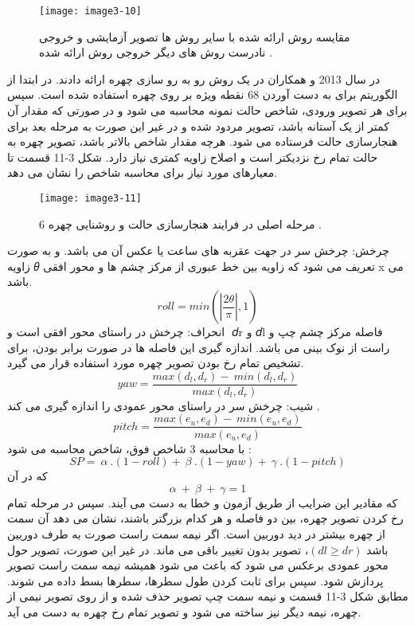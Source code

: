 \begin{figure}[h]
\centering
  \texttt{[image: image3-10]}
  \caption{مقایسه روش ارائه شده با سایر روش ها  تصویر آزمایشی  و  خروجی نادرست روش های دیگر  خروجی روش ارائه شده \cite{ref1}.}
  \label{image2-1}
\end{figure}
\noindent
در سال 2013  و همکاران در \cite{6196234} یک روش رو به رو سازی چهره ارائه دادند. در ابتدا از الگوریتم   برای به دست آوردن 68 نقطه ویژه بر روی چهره استفاده شده است. سپس برای هر تصویر ورودی، شاخص حالت نمونه   محاسبه می شود و در صورتی که مقدار آن کمتر از یک آستانه باشد، تصویر مردود شده و در غیر این صورت به مرحله بعد برای هنجارسازی حالت فرستاده می شود. هرچه مقدار شاخص  بالاتر باشد، تصویر چهره به حالت تمام رخ نزدیکتر است و اصلاح زاویه کمتری نیاز دارد. شکل 3-11 قسمت  تا  معیارهای مورد نیاز برای محاسبه شاخص  را نشان می دهد.
\begin{figure}[h]
\centering
  \texttt{[image: image3-11]}
  \caption{6 مرحله اصلی در فرایند هنجارسازی حالت و روشنایی چهره \cite{ref1}.}
  \label{image2-1}
\end{figure}
\noindent
چرخش: چرخش سر در جهت عقربه های ساعت یا عکس آن می باشد. و به صورت زاویه 𝜃 تعریف می شود که زاویه بین خط عبوری از مرکز چشم ها و محور افقی x می باشد.
\begin{equation}\label{eq3-4}
roll=min(\left|\frac{2\theta}{\pi}\right|,1)
\end{equation}‏
\noindent	
انحراف: چرخش در راستای محور افقی است و 𝑑r و 𝑑l فاصله مرکز چشم چپ و راست از نوک بینی می باشد. اندازه گیری این فاصله ها در صورت برابر بودن، برای تشخیص تمام رخ بودن تصویر چهره مورد استفاده قرار می گیرد.
\begin{equation}\label{eq3-5}
yaw=\frac{max\left(d_l,d_r\right)-\ min(d_l,d_r)}{max(d_l,d_r)}
\end{equation}‏
\noindent
شیب: چرخش سر در راستای محور عمودی را اندازه گیری می کند.
\begin{equation}\label{eq3-6}
pitch=\frac{max\left(e_u,e_d\right)-\ min(e_u,e_d)}{max(e_u,e_d)}	
\end{equation}‏
\noindent
با محاسبه 3 شاخص فوق، شاخص  محاسبه می شود:
\begin{equation}\label{eq3-7}
SP=\ \alpha\ .(1-roll)+\ \beta\ .(1-yaw)+\ \gamma\ .(1-pitch)	
\end{equation}
\noindent‏
که در آن‏
\begin{equation}\label{eq3-8}
\alpha\ +\ \beta\ +\ \gamma=1	
\end{equation}‏
\noindent
که مقادیر این ضرایب از طریق آزمون و خطا به دست می آیند. سپس در مرحله تمام رخ کردن تصویر چهره، بین دو فاصله  و  هر کدام بزرگتر باشند، نشان می دهد آن سمت از چهره بیشتر در دید دوربین است. اگر نیمه سمت راست صورت به طرف دوربین باشد
$(dl \geq dr)$،
تصویر بدون تغییر باقی می ماند. در غیر این صورت، تصویر حول محور عمودی برعکس می شود که باعث می شود همیشه نیمه سمت راست تصویر پردازش شود. سپس برای ثابت کردن طول سطرها، سطرها بسط داده می شوند. مطابق شکل 3-11 قسمت  و  نیمه سمت چپ تصویر حذف شده و از روی تصویر نیمی از چهره، نیمه دیگر نیز ساخته می شود و تصویر تمام رخ چهره به دست می آید.

